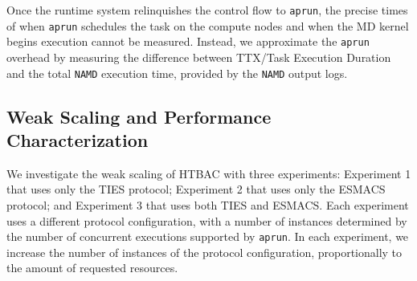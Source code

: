 Once the runtime system relinquishes the control flow to \texttt{aprun}, the
precise times of when \texttt{aprun} schedules the task on the compute nodes
and when the MD kernel begins execution cannot be measured. Instead, we
approximate the \texttt{aprun} overhead by measuring the difference between
TTX/Task Execution Duration and the total \texttt{NAMD} execution time,
provided by the \texttt{NAMD} output logs.






\subsection{Weak Scaling and Performance Characterization}

We investigate the weak scaling of HTBAC with three experiments: Experiment 1
that uses only the TIES protocol; Experiment 2 that uses only the ESMACS
protocol; and Experiment 3 that uses both TIES and ESMACS. Each experiment
uses a different protocol configuration, with a number of instances
determined by the number of concurrent executions supported by
\texttt{aprun}. In each experiment, we increase the number of instances of
the protocol configuration, proportionally to the amount of requested
resources.

